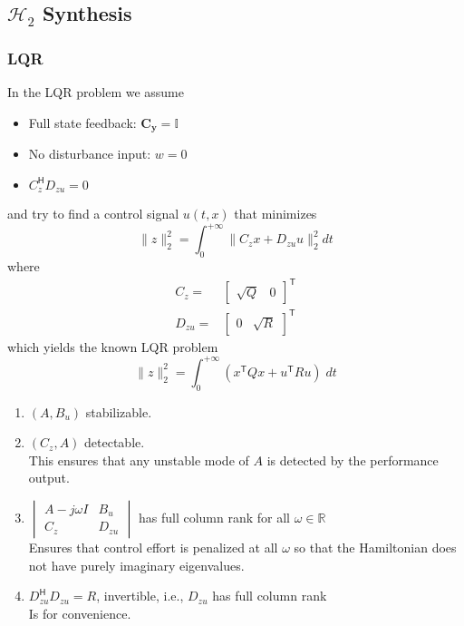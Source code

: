 \subsection{\texorpdfstring{$\mathcal{H}_2$}{H2} Synthesis}
\subsubsection{LQR}
In the LQR problem we assume
\begin{itemize}
    \item Full state feedback: $\mathbf{C_y}=\mathbf{\mathbb{I}}$
    \item No disturbance input: $w=0$
    \item $C_z^{\mathsf{H}}D_{zu}=0$
\end{itemize}
and try to find a control signal $u(t,x)$ that minimizes
\begin{equation*}
    \|z\|_2^2=\int_0^{+\infty}\|C_z x+D_{zu}u\|_2^2 dt
\end{equation*}
where
\begin{align*}
    C_z=    &
    \begin{bmatrix}
        \sqrt{Q} & 0
    \end{bmatrix}^{\mathsf{T}} \\
    D_{zu}= &
    \begin{bmatrix}
        0 & \sqrt{R}
    \end{bmatrix}^{\mathsf{T}}
\end{align*}
which yields the known LQR problem
\begin{equation*}
    \|z\|_2^2=\int_0^{+\infty}(x^{\mathsf{T}}Qx+u^{\mathsf{T}}Ru)\;dt
\end{equation*}


\begin{enumerate}
    \item $(A,B_u)$ stabilizable.
    \item $(C_z,A)$ detectable.\\
          This ensures that any unstable mode of $A$ is detected by the performance output.
    \item $\begin{vmatrix} A- j\omega I& B_u\\ C_z& D_{zu}\end{vmatrix}$ has full column rank for all $\omega\in\mathbb{R}$\\
          Ensures that control effort is penalized at all $\omega$ so that the Hamiltonian does not have purely imaginary eigenvalues.
    \item $D_{zu}^{\mathsf{H}}D_{zu}=R$, invertible, i.e., $D_{zu}$ has full column rank\\
          Is for convenience.
\end{enumerate}


